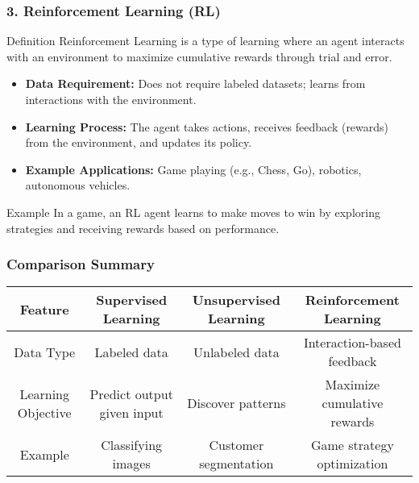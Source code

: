 \documentclass[aspectratio=169]{beamer}
\begin{document}
\begin{frame}[fragile]
    \frametitle{3. Reinforcement Learning (RL)}
    \begin{block}{Definition}
        Reinforcement Learning is a type of learning where an agent interacts with an environment to maximize cumulative rewards through trial and error.
    \end{block}
    \begin{itemize}
        \item \textbf{Data Requirement:} Does not require labeled datasets; learns from interactions with the environment.
        \item \textbf{Learning Process:} The agent takes actions, receives feedback (rewards) from the environment, and updates its policy.
        \item \textbf{Example Applications:} Game playing (e.g., Chess, Go), robotics, autonomous vehicles.
    \end{itemize}
    \begin{block}{Example}
        In a game, an RL agent learns to make moves to win by exploring strategies and receiving rewards based on performance.
    \end{block}
\end{frame}

\begin{frame}[fragile]
    \frametitle{Comparison Summary}
    \begin{table}[ht]
        \centering
        \begin{tabular}{|c|c|c|c|}
            \hline
            \textbf{Feature} & \textbf{Supervised Learning} & \textbf{Unsupervised Learning} & \textbf{Reinforcement Learning} \\
            \hline
            Data Type & Labeled data & Unlabeled data & Interaction-based feedback \\
            \hline
            Learning Objective & Predict output given input & Discover patterns & Maximize cumulative rewards \\
            \hline
            Example & Classifying images & Customer segmentation & Game strategy optimization \\
            \hline
        \end{tabular}
    \end{table}
\end{frame}
\end{document}
